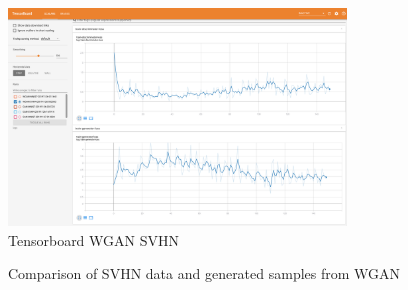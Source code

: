 \documentclass{article}
\begin{document}
\begin{figure}[!htb]
  \centering
  \includegraphics[width=0.8\textwidth]{tensorboard-WGAN-SVHN.png}
  \caption{Tensorboard WGAN SVHN}
  \label{fig:TB_WGAN_SVHN}
\end{figure}

\begin{figure}[!htb]
  \centering
  \caption{Comparison of SVHN data and generated samples from WGAN}
\end{figure}
\end{document}
